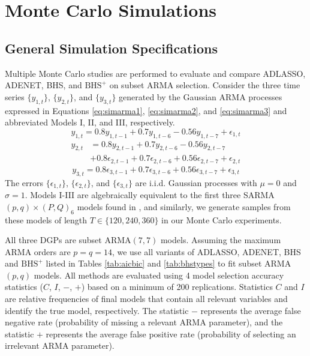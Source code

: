 \section{Monte Carlo Simulations}
\label{sec:mc}

\subsection{General Simulation Specifications}
Multiple Monte Carlo studies are performed to evaluate and compare ADLASSO, ADENET, BHS, and $\textrm{BHS}^+$ on subset ARMA selection. Consider the three time series $\{y_{1,t}\}$, $\{y_{2,t}\}$, and $\{y_{3,t}\}$ generated by the Gaussian ARMA processes expressed in Equations \ref{eq:simarma1}, \ref{eq:simarma2}, and \ref{eq:simarma3} and abbreviated Models I, II, and III, respectively.
\begin{equation}
	\label{eq:simarma1}
	y_{1,t}=0.8y_{1,t-1}+0.7y_{1,t-6}-0.56y_{1,t-7}+\epsilon_{1,t}
\end{equation}
\begin{equation}
	\begin{split}
	\label{eq:simarma2}
	y_{2,t}&=0.8y_{2,t-1}+0.7y_{2,t-6}-0.56y_{2,t-7}\\
	&+0.8\epsilon_{2,t-1}+0.7\epsilon_{2,t-6}+0.56\epsilon_{2,t-7}+\epsilon_{2,t}
	\end{split}
\end{equation}
\begin{equation}
	\label{eq:simarma3}
	y_{3,t}=0.8\epsilon_{3,t-1}+0.7\epsilon_{3,t-6}+0.56\epsilon_{3,t-7}+\epsilon_{3,t}
\end{equation}
The errors $\{\epsilon_{1,t}\}$, $\{\epsilon_{2,t}\}$, and $\{\epsilon_{3,t}\}$ are i.i.d. Gaussian processes with $\mu=0$ and $\sigma=1$. Models I-III are algebraically equivalent to the first three SARMA$(p,q)\times(P,Q)_6$ models found in \cite{Chen2011}, and similarly, we generate samples from these models of length $T\in \{120, 240, 360\}$ in our Monte Carlo experiments. 

All three DGPs are subset ARMA$(7,7)$ models. Assuming the maximum ARMA orders are $p=q=14$, we use all variants of ADLASSO, ADENET, BHS and $\textrm{BHS}^+$ listed in Tables \ref{tab:aicbic} and \ref{tab:bhstypes} to fit subset ARMA$(p,q)$ models. All methods are evaluated using 4 model selection accuracy statistics ($C$, $I$, $-$, $+$) based on a minimum of 200 replications. Statistics $C$ and $I$ are relative frequencies of final models that contain all relevant variables and identify the true model, respectively. The statistic $-$ represents the average false negative rate (probability of missing a relevant ARMA parameter), and the statistic $+$ represents the average false positive rate (probability of selecting an irrelevant ARMA parameter).


